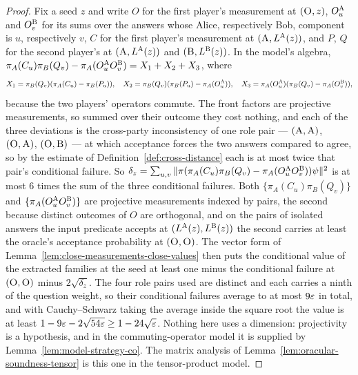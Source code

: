 \begin{proof}
\leanok
Fix a seed $z$ and write $O$ for the first player's measurement at $(\textsc{O}, z)$, $O^{\textsc{A}}_u$
and $O^{\textsc{B}}_v$ for its sums over the answers whose Alice, respectively Bob, component is $u$,
respectively $v$, $C$ for the first player's measurement at $(\textsc{A}, L^{\textsc{A}}(z))$, and $P$, $Q$
for the second player's at $(\textsc{A}, L^{\textsc{A}}(z))$ and $(\textsc{B}, L^{\textsc{B}}(z))$. In the model's
algebra, $\pi_A(C_u)\pi_B(Q_v) - \pi_A(O^{\textsc{A}}_u O^{\textsc{B}}_v) = X_1 + X_2 + X_3$, where
\begin{equation*}
  X_1 = \pi_B(Q_v)(\pi_A(C_u) - \pi_B(P_u)), \quad
  X_2 = \pi_B(Q_v)(\pi_B(P_u) - \pi_A(O^{\textsc{A}}_u)), \quad
  X_3 = \pi_A(O^{\textsc{A}}_u)(\pi_B(Q_v) - \pi_A(O^{\textsc{B}}_v)),
\end{equation*}
because the two players' operators commute. The front factors are projective measurements, so
summed over their outcome they cost nothing, and each of the three deviations is the cross-party
inconsistency of one role pair --- $(\textsc{A}, \textsc{A})$, $(\textsc{O}, \textsc{A})$, $(\textsc{O}, \textsc{B})$ ---
at which acceptance forces the two answers compared to agree, so by the estimate of
Definition~\ref{def:cross-distance} each is at most twice that pair's conditional failure. So
$\delta_z = \sum_{u,v} \|\pi(\pi_A(C_u)\pi_B(Q_v) - \pi_A(O^{\textsc{A}}_u O^{\textsc{B}}_v))\psi\|^2$ is at
most $6$ times the sum of the three conditional failures. Both
$\{\pi_A(C_u)\pi_B(Q_v)\}$ and $\{\pi_A(O^{\textsc{A}}_u O^{\textsc{B}}_v)\}$ are projective measurements
indexed by pairs, the second because distinct outcomes of $O$ are orthogonal, and on the pairs of
isolated answers the input predicate accepts at $(L^{\textsc{A}}(z), L^{\textsc{B}}(z))$ the second carries at
least the oracle's acceptance probability at $(\textsc{O}, \textsc{O})$. The vector form of
Lemma~\ref{lem:close-measurements-close-values} then puts the conditional value of the extracted
families at the seed at least one minus the conditional failure at $(\textsc{O}, \textsc{O})$ minus
$2\sqrt{\delta_z}$. The four role pairs used are distinct and each carries a ninth of the
question weight, so their conditional failures average to at most $9\varepsilon$ in total, and with
Cauchy--Schwarz taking the average inside the square root the value is at least
$1 - 9\varepsilon - 2\sqrt{54\varepsilon} \geq 1 - 24\sqrt{\varepsilon}$. Nothing here uses a dimension: projectivity
is a hypothesis, and in the commuting-operator model it is supplied by
Lemma~\ref{lem:model-strategy-co}. The matrix analysis of
Lemma~\ref{lem:oracular-soundness-tensor} is this one in the tensor-product model.
\end{proof}


